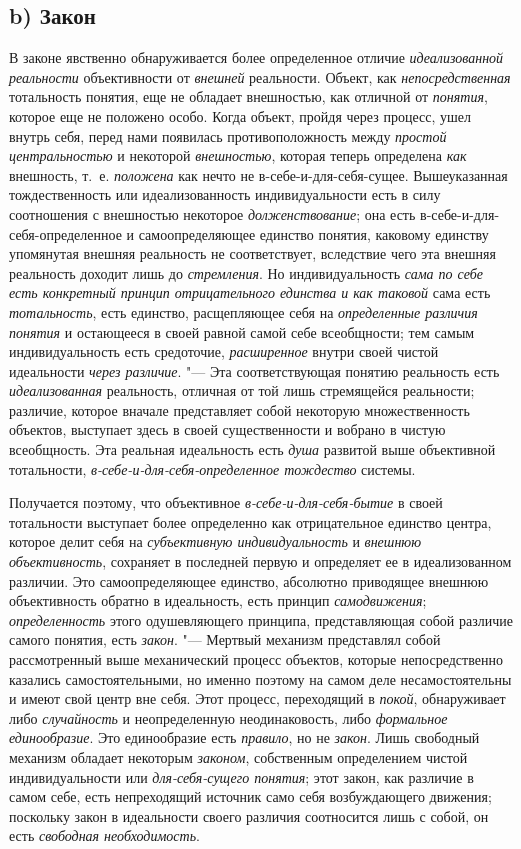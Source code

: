 \subsection[b) Закон]{b) Закон}
В законе явственно обнаруживается более определенное отличие
{\em идеализованной реальности}
объективности от
{\em внешней} реальности.
Объект, как {\em непосредственная}
тотальность понятия, еще не обладает внешностью, как отличной
от {\em понятия}, которое
еще не положено особо. Когда объект, пройдя через процесс, ушел внутрь
себя, перед нами появилась противоположность между
{\em простой центральностью}
и некоторой
{\em внешностью}, которая
теперь определена {\em как}
внешность, т.~е.
{\em положена} как нечто
не в-себе-и-для-себя-сущее. Вышеуказанная тождественность или
идеализованность индивидуальности есть в силу соотношения с внешностью
некоторое {\em долженствование};
она есть в-себе-и-для-себя-определенное и самоопределяющее
единство понятия, каковому единству упомянутая внешняя реальность не
соответствует, вследствие чего эта внешняя реальность доходит лишь до
{\em стремления}. Но
индивидуальность {\em сама по себе есть
конкретный принцип отрицательного единства и как таковой}
сама есть
{\em тотальность}, есть
единство, расщепляющее себя на
{\em определенные различия понятия}
и остающееся в своей равной самой себе всеобщности; тем самым
индивидуальность есть средоточие,
{\em расширенное} внутри
своей чистой идеальности {\em через
различие}. "--- Эта соответствующая понятию реальность есть
{\em идеализованная}
реальность, отличная от той лишь стремящейся реальности;
различие, которое вначале представляет собой некоторую множественность
объектов, выступает здесь в своей существенности и вобрано в чистую
всеобщность. Эта реальная идеальность есть
{\em душа} развитой выше
объективной тотальности,
{\em в-себе-и-для-себя-определенное
тождество} системы.

Получается поэтому, что объективное
{\em в-себе-и-для-себя-бытие}
в своей тотальности выступает более определенно как
отрицательное единство центра, которое делит себя на
{\em субъективную индивидуальность}
и {\em внешнюю
объективность}, сохраняет в последней первую и определяет ее
в идеализованном различии. Это самоопределяющее единство, абсолютно
приводящее внешнюю объективность обратно в идеальность, есть принцип
{\em самодвижения};
{\em определенность} этого
одушевляющего принципа, представляющая собой различие самого понятия, есть
{\em закон}. "--- Мертвый
механизм представлял собой рассмотренный выше механический
процесс объектов, которые непосредственно казались самостоятельными, но
именно поэтому на самом деле несамостоятельны и имеют свой центр вне себя.
Этот процесс, переходящий в
{\em покой}, обнаруживает
либо {\em случайность} и
неопределенную неодинаковость, либо
{\em формальное единообразие}.
Это единообразие есть
{\em правило}, но не
{\em закон}. Лишь
свободный механизм обладает некоторым
{\em законом},
собственным определением чистой индивидуальности или
{\em для-себя-сущего понятия};
этот закон, как различие в самом себе, есть непреходящий
источник само себя возбуждающего движения; поскольку закон в идеальности
своего различия соотносится лишь с собой, он есть
{\em свободная необходимость}.

